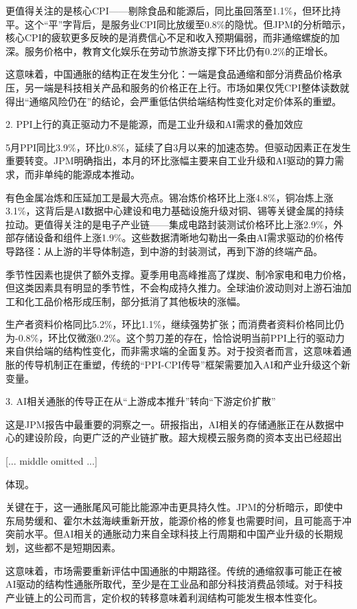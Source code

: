 \documentclass[11pt]{ctexart}
\begin{document}
更值得关注的是核心CPI——剔除食品和能源后，同比虽回落至1.1\%，但环比持平。这个“平”字背后，是服务业CPI同比放缓至0.8\%的隐忧。但JPM的分析暗示，核心CPI的疲软更多反映的是消费信心不足和收入预期偏弱，而非通缩螺旋的加深。服务价格中，教育文化娱乐在劳动节旅游支撑下环比仍有0.2\%的正增长。

这意味着，中国通胀的结构正在发生分化：一端是食品通缩和部分消费品价格承压，另一端是科技相关产品和服务的价格正在上行。市场如果仅凭CPI整体读数就得出“通缩风险仍在”的结论，会严重低估供给端结构性变化对定价体系的重塑。

2. PPI上行的真正驱动力不是能源，而是工业升级和AI需求的叠加效应

5月PPI同比3.9\%，环比0.8\%，延续了自3月以来的加速态势。但驱动因素正在发生重要转变。JPM明确指出，本月的环比涨幅主要来自工业升级和AI驱动的算力需求，而非单纯的能源成本推动。

有色金属冶炼和压延加工是最大亮点。锡冶炼价格环比上涨4.8\%，铜冶炼上涨3.1\%，这背后是AI数据中心建设和电力基础设施升级对铜、锡等关键金属的持续拉动。更值得关注的是电子产业链——集成电路封装测试价格环比上涨2.9\%，外部存储设备和组件上涨1.9\%。这些数据清晰地勾勒出一条由AI需求驱动的价格传导路径：从上游的半导体制造，到中游的封装测试，再到下游的终端产品。

季节性因素也提供了额外支撑。夏季用电高峰推高了煤炭、制冷家电和电力价格，但这类因素具有明显的季节性，不会构成持久推力。全球油价波动则对上游石油加工和化工品价格形成压制，部分抵消了其他板块的涨幅。

生产者资料价格同比5.2\%，环比1.1\%，继续强势扩张；而消费者资料价格同比仍为-0.8\%，环比仅微涨0.2\%。这个剪刀差的存在，恰恰说明当前PPI上行的驱动力来自供给端的结构性变化，而非需求端的全面复苏。对于投资者而言，这意味着通胀的传导机制正在重塑，传统的“PPI-CPI传导”框架需要加入AI和产业升级这个新变量。

3. AI相关通胀的传导正在从“上游成本推升”转向“下游定价扩散”

这是JPM报告中最重要的洞察之一。研报指出，AI相关的存储通胀正在从数据中心的建设阶段，向更广泛的产业链扩散。超大规模云服务商的资本支出已经超出

[... middle omitted ...]

体现。

关键在于，这一通胀尾风可能比能源冲击更具持久性。JPM的分析暗示，即使中东局势缓和、霍尔木兹海峡重新开放，能源价格的修复也需要时间，且可能高于冲突前水平。但AI相关的通胀动力来自全球科技上行周期和中国产业升级的长期规划，这些都不是短期因素。

这意味着，市场需要重新评估中国通胀的中期路径。传统的通缩叙事可能正在被AI驱动的结构性通胀所取代，至少是在工业品和部分科技消费品领域。对于科技产业链上的公司而言，定价权的转移意味着利润结构可能发生根本性变化。
\end{document}
